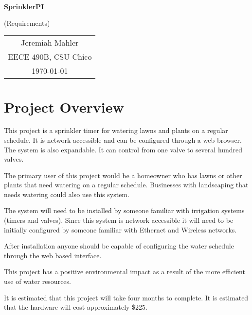 \documentclass[12pt,letterpaper]{article}
\begin{document}

\vspace*{1.0in}

\centerline{\Large \textbf{SprinklerPI}}
\centerline{(Requirements)}

\vspace{0.5in}

\begin{center}
\begin{tabular}{c}
Jeremiah Mahler \\
EECE 490B, CSU Chico \\
\today
\end{tabular}
\end{center}

\thispagestyle{empty}

\vfill


\pagebreak
\tableofcontents
{}
\pagebreak

\section{Project Overview}

This project is a sprinkler timer for watering lawns and plants
on a regular schedule.
It is network accessible and can be configured through a web browser.
The system is also expandable.
It can control from one valve to several hundred valves.

The primary user of this project would be a homeowner who has
lawns or other plants that need watering on a regular schedule.
Businesses with landscaping that needs watering could also use
this system.

The system will need to be installed by someone familiar with
irrigation systems (timers and valves).
Since this system is network accessible it will need to be initially
configured by someone familiar with Ethernet and Wireless networks.

After installation anyone should be capable of configuring the
water schedule through the web based interface.

This project has a positive environmental impact as a result of the
more efficient use of water resources.

It is estimated that this project will take four months to complete.
It is estimated that the hardware will cost approximately \$225.
\end{document}
